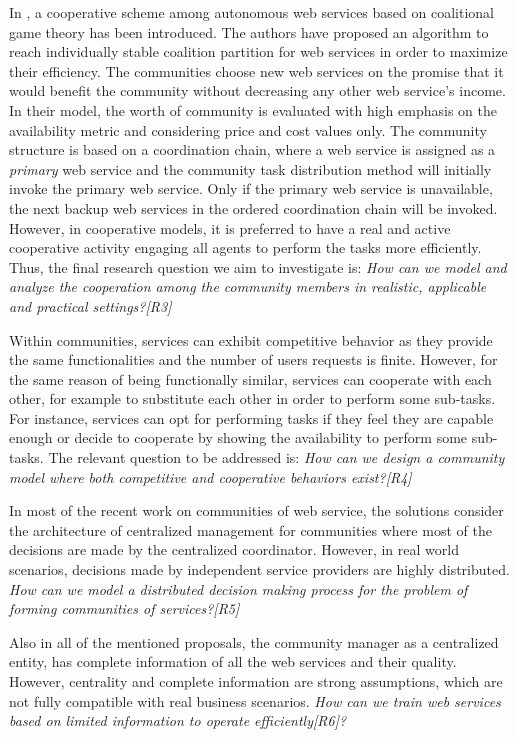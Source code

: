 In \cite{10.1109/TSC.2012.12}, a cooperative scheme among
autonomous web services based on coalitional game theory has been
introduced. The authors have proposed an algorithm to reach
individually stable coalition partition for web services in order
to maximize their efficiency. The communities choose new web
services on the promise that it would benefit the community
without decreasing any other web service's income. In their model,
the worth of community is evaluated with high emphasis on the
availability metric and considering price and cost values only.
The community structure is based on a coordination chain, where a
web service is assigned as a \emph{primary} web service and the
community task distribution method will initially invoke the
primary web service. Only if the primary web service is
unavailable, the next backup web services in the ordered
coordination chain will be invoked. However, in cooperative
models, it is preferred to have a real and active cooperative
activity engaging all agents to perform the tasks more
efficiently. Thus, the final research question we aim to investigate is: \emph{How can we model and analyze the cooperation
among the community members in realistic, applicable and practical
settings?[R3]}

Within communities, services can exhibit competitive behavior as they provide the same functionalities and the number of users requests is finite.
However, for the same reason of being functionally similar, services can cooperate with each other, for example to substitute each other in order to perform some sub-tasks.
For instance, services can opt for performing tasks if they feel they are capable enough
or decide to cooperate by showing the availability to perform some sub-tasks. The relevant question to be addressed is: \emph{How can we design a community model where both competitive and cooperative behaviors exist?[R4]}

In most of the recent work on communities of web service, the solutions consider the architecture of centralized management for communities where most of the decisions are made by the centralized coordinator. However, in real world scenarios, decisions made by independent service providers are highly distributed.  \emph{How can we model a distributed decision making process for the problem of forming communities of services?[R5]}

Also in all of the mentioned proposals, the community manager as a centralized entity, has complete information of all the web services and their quality. However, centrality and complete information are strong assumptions, which are not fully compatible with real business scenarios.
\emph{How can we train web services based on limited information to operate efficiently[R6]?}

